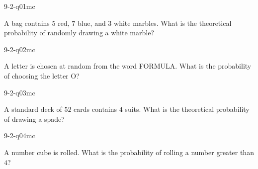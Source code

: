 

\begin{practiceQuestion}{9-2-q01}{mc}
\begin{questionText}
A bag contains $5$ red, $7$ blue, and $3$ white marbles. What is the theoretical probability of randomly drawing a white marble?
\end{questionText}
\end{practiceQuestion}

\begin{practiceQuestion}{9-2-q02}{mc}
\begin{questionText}
A letter is chosen at random from the word FORMULA. What is the probability of choosing the letter O?
\end{questionText}
\end{practiceQuestion}

\begin{practiceQuestion}{9-2-q03}{mc}
\begin{questionText}
A standard deck of $52$ cards contains $4$ suits. What is the theoretical probability of drawing a spade?
\end{questionText}
\end{practiceQuestion}

\begin{practiceQuestion}{9-2-q04}{mc}
\begin{questionText}
A number cube is rolled. What is the probability of rolling a number greater than $4$?
\end{questionText}
\end{practiceQuestion}

